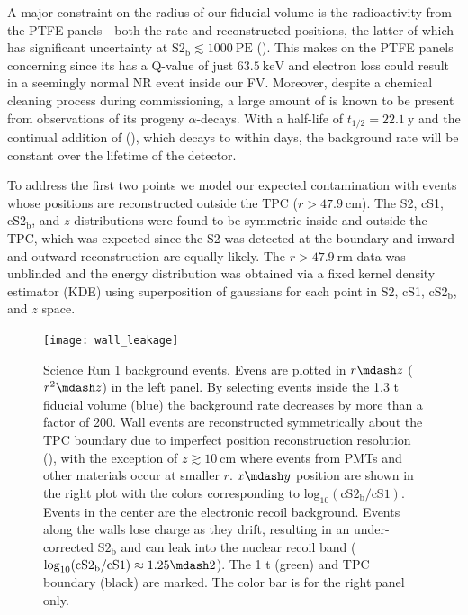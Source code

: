A major constraint on the radius of our fiducial volume is the radioactivity from the PTFE panels - both the rate and reconstructed
positions, the latter of which has significant uncertainty at $\mathrm{S2_b} \lesssim 1000\ \mathrm{PE}$
().  This makes  on the PTFE panels concerning since its \betadecay has
a Q-value of just $63.5\ \mathrm{keV}$ and electron loss could result in a seemingly normal NR event inside our FV.  Moreover, despite a
chemical cleaning process during commissioning, a large amount of  is known to be present from observations of its progeny
 $\alpha$-decays.  With a half-life of $t_{1/2} = 22.1\ \mathrm{y}$ and the continual addition of 
(), which decays to  within days, the background rate will be
constant over the lifetime of the detector.

To address the first two points we model our expected contamination with events whose positions are reconstructed outside the
TPC ($r > 47.9\ \mathrm{cm}$).  The S2, cS1, cS2$_{\mathrm{b}}$, and $z$
distributions were found to be symmetric inside and outside the TPC, which was expected since the S2 was detected at the boundary and
inward and outward reconstruction are equally likely.  The
$r > 47.9\ \mathrm{rm}$ data was unblinded and the energy distribution was obtained via a fixed kernel density estimator (KDE) using
superposition of gaussians for each point in S2, cS1, cS2$_{\mathrm{b}}$, and $z$ space.

\begin{figure}
\centering
\texttt{[image: wall\_leakage]}
\caption{Science Run 1 background events.  Evens are plotted in $r \mdash z$ ($r^2 \mdash z$) in the left panel.  By selecting events
inside the 1.3
t fiducial volume (blue) the background rate decreases by more than a factor of 200.  Wall events are reconstructed symmetrically
about the TPC boundary due to imperfect position reconstruction resolution (), with the
exception of $z \gtrsim 10\ \mathrm{cm}$ where events from PMTs and other materials occur at smaller $r$.  $x \mdash y$ position are shown
in
the right plot with the colors corresponding to $\mathrm{log}_{10}(\mathrm{cS2_b / cS1})$.  Events in the center are the electronic recoil
background.  Events along the walls lose charge as they drift,
resulting in an under-corrected $\mathrm{S2_b}$ and can leak into the nuclear recoil band
($\mathrm{log}_{10}(\mathrm{cS2_b / cS1}) \approx 1.25 \mdash 2$).  The 1 t (green) and TPC boundary (black) are marked.  The color bar is
for the right panel only.}
\label{fig:backgrounds_detector_materials_wall_leakage}
\end{figure}

